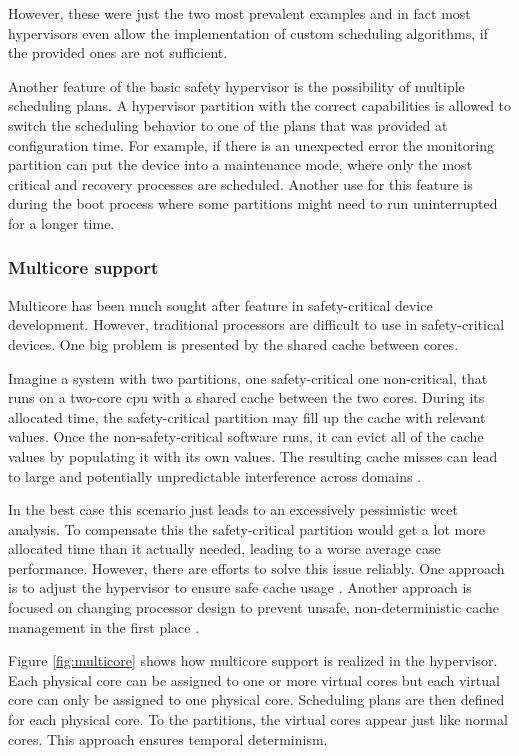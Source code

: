 However, these were just the two most prevalent examples and in fact most hypervisors even allow the implementation of custom scheduling algorithms, if the provided ones are not sufficient.

Another feature of the basic safety hypervisor is the possibility of multiple scheduling plans. A hypervisor partition with the correct capabilities is allowed to switch the scheduling behavior to one of the plans that was provided at configuration time. For example, if there is an unexpected error the monitoring partition can put the device into a maintenance mode, where only the most critical and recovery processes are scheduled. Another use for this feature is during the boot process where some partitions might need to run uninterrupted for a longer time.

\subsubsection{Multicore support}
Multicore has been much sought after feature in safety-critical device development. However, traditional processors are difficult to use in safety-critical devices. 
One big problem is presented by the shared cache between cores.

Imagine a system with two partitions, one safety-critical one non-critical, that runs on a two-core \acrshort{cpu} with a shared cache between the two cores. During its allocated time, the safety-critical partition may fill up the cache with relevant values. Once the non-safety-critical software runs, it can evict all of the cache values by populating it with its own values. The resulting cache misses can lead to large and potentially unpredictable interference across domains \cite{biondi2018challenges}.

In the best case this scenario just leads to an excessively pessimistic \acrfull{wcet} analysis. To compensate this the safety-critical partition would get a lot more allocated time than it actually needed, leading to a worse average case performance. However, there are efforts to solve this issue reliably. One approach is to adjust the hypervisor to ensure safe cache usage \cite{modica2018supporting}. Another approach is focused on changing processor design to prevent unsafe, non-deterministic cache management in the first place \cite{el2013across}.

Figure \ref{fig:multicore} shows how multicore support is realized in the hypervisor. Each physical core can be assigned to one or more virtual cores but each virtual core can only be assigned to one physical core. Scheduling plans are then defined for each physical core. To the partitions, the virtual cores appear just like normal cores. This approach ensures temporal determinism.

